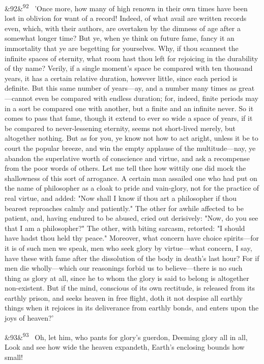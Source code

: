 \documentclass[12pt]{article}
\newcommand{\para}[1][]{\par\noindent\ifx&#1&\else\textsuperscript{\footnotesize #1}~\fi}
\begin{document}
\para[92] 'Once more, how many of high renown in their own times have been lost in oblivion for want of a record! Indeed, of what avail are written records even, which, with their authors, are overtaken by the dimness of age after a somewhat longer time? But ye, when ye think on future fame, fancy it an immortality that ye are begetting for yourselves. Why, if thou scannest the infinite spaces of eternity, what room hast thou left for rejoicing in the durability of thy name? Verily, if a single moment's space be compared with ten thousand years, it has a certain relative duration, however little, since each period is definite. But this same number of years---ay, and a number many times as great---cannot even be compared with endless duration; for, indeed, finite periods may in a sort be compared one with another, but a finite and an infinite never. So it comes to pass that fame, though it extend to ever so wide a space of years, if it be compared to never-lessening eternity, seems not short-lived merely, but altogether nothing. But as for you, ye know not how to act aright, unless it be to court the popular breeze, and win the empty applause of the multitude---nay, ye abandon the superlative worth of conscience and virtue, and ask a recompense from the poor words of others. Let me tell thee how wittily one did mock the shallowness of this sort of arrogance. A certain man assailed one who had put on the name of philosopher as a cloak to pride and vain-glory, not for the practice of real virtue, and added: "Now shall I know if thou art a philosopher if thou bearest reproaches calmly and patiently." The other for awhile affected to be patient, and, having endured to be abused, cried out derisively: "Now, do you see that I am a philosopher?" The other, with biting sarcasm, retorted: "I should have hadst thou held thy peace." Moreover, what concern have choice spirits---for it is of such men we speak, men who seek glory by virtue---what concern, I say, have these with fame after the dissolution of the body in death's last hour? For if men die wholly---which our reasonings forbid us to believe---there is no such thing as glory at all, since he to whom the glory is said to belong is altogether non-existent. But if the mind, conscious of its own rectitude, is released from its earthly prison, and seeks heaven in free flight, doth it not despise all earthly things when it rejoices in its deliverance from earthly bonds, and enters upon the joys of heaven?'

\para[93] Oh, let him, who pants for glory's guerdon, Deeming glory all in all, Look and see how wide the heaven expandeth, Earth's enclosing bounds how small!
\end{document}
